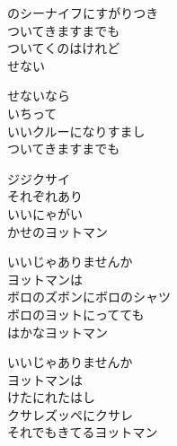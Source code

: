 \documentclass[10pt,b5j]{tarticle} %
\begin{document}
\vspace{1.5em} %
\newcommand{\linespace}{0.5em} %
\newcommand{\blocksize}{0.5\hsize} %
\begin{enumerate} %
    \begin{minipage}[c]{\blocksize}
    
        \vspace{\linespace}
        \item
        のシーナイフにすがりつき\\
        ついてきますまでも\\
        ついてくのはけれど\\
        せない
        
        \vspace{\linespace}
        \item
        せないなら\\
        いちって\\
        いいクルーになりすまし\\
        ついてきますまでも
        
        \vspace{\linespace}
        \item
        ジジクサイ\\
        それぞれあり\\
        いいにゃがい\\
        かせのヨットマン
        
        \vspace{\linespace}
        \item
        いいじゃありませんか\\
        ヨットマンは\\
        ボロのズボンにボロのシャツ\\
        ボロのヨットにってても\\
        はかなヨットマン
        
        \vspace{\linespace}
        \item
        いいじゃありませんか\\
        ヨットマンは\\
        けたにれたはし\\
        クサレズッペにクサレ\\
        それでもきてるヨットマン
        

\end{minipage}
\end{enumerate}
\end{document}
